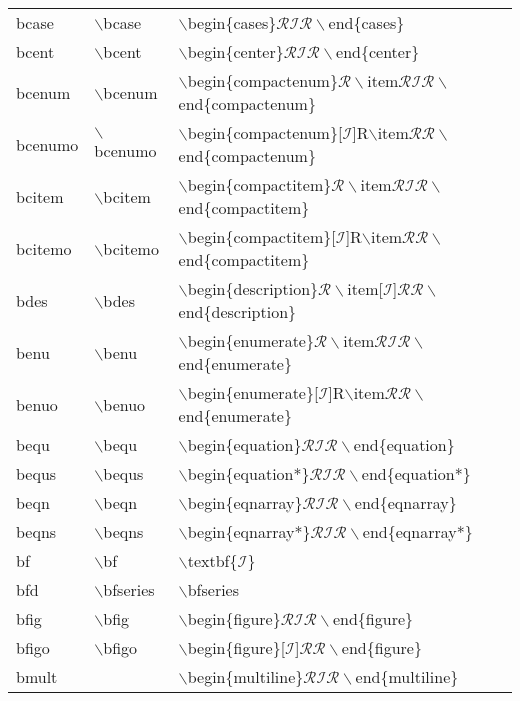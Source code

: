 \begin{longtable}{p{20mm}p{20mm}p{65mm}}
bcase & $\backslash$bcase & $\backslash$begin\{cases\}$\mathcal{RIR}\backslash$end\{cases\}\\
bcent & $\backslash$bcent & $\backslash$begin\{center\}$\mathcal{RIR}\backslash$end\{center\}\\
bcenum & $\backslash$bcenum & $\backslash$begin\{compactenum\}$\mathcal{R}\backslash$item$\mathcal{RIR}\backslash$end\{compactenum\}\\
bcenumo & $\backslash$bcenumo & $\backslash$begin\{compactenum\}[$\mathcal{I}$]R$\backslash$item$\mathcal{RR}\backslash$end\{compactenum\}\\
bcitem & $\backslash$bcitem & $\backslash$begin\{compactitem\}$\mathcal{R}\backslash$item$\mathcal{RIR}\backslash$end\{compactitem\}\\
bcitemo & $\backslash$bcitemo & $\backslash$begin\{compactitem\}[$\mathcal{I}$]R$\backslash$item$\mathcal{RR}\backslash$end\{compactitem\}\\
bdes & $\backslash$bdes & $\backslash$begin\{description\}$\mathcal{R}\backslash$item[$\mathcal{I}$]$\mathcal{RR}\backslash$end\{description\}\\
benu & $\backslash$benu & $\backslash$begin\{enumerate\}$\mathcal{R}\backslash$item$\mathcal{RIR}\backslash$end\{enumerate\}\\
benuo & $\backslash$benuo & $\backslash$begin\{enumerate\}[$\mathcal{I}$]R$\backslash$item$\mathcal{RR}\backslash$end\{enumerate\}\\
bequ & $\backslash$bequ & $\backslash$begin\{equation\}$\mathcal{RIR}\backslash$end\{equation\}\\
bequs & $\backslash$bequs & $\backslash$begin\{equation*\}$\mathcal{RIR}\backslash$end\{equation*\}\\
beqn & $\backslash$beqn & $\backslash$begin\{eqnarray\}$\mathcal{RIR}\backslash$end\{eqnarray\}\\
beqns & $\backslash$beqns & $\backslash$begin\{eqnarray*\}$\mathcal{RIR}\backslash$end\{eqnarray*\}\\
bf & $\backslash$bf & $\backslash$textbf\{$\mathcal{I}$\}\\
bfd & $\backslash$bfseries & $\backslash$bfseries\\
bfig & $\backslash$bfig & $\backslash$begin\{figure\}$\mathcal{RIR}\backslash$end\{figure\}\\
bfigo & $\backslash$bfigo & $\backslash$begin\{figure\}[$\mathcal{I}$]$\mathcal{RR}\backslash$end\{figure\}\\
bmult &  & $\backslash$begin\{multiline\}$\mathcal{RIR}\backslash$end\{multiline\}\\

\end{longtable}
